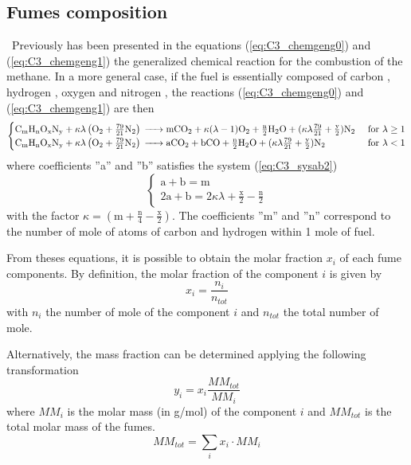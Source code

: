 \subsection{Fumes composition}
\quad\ Previously has been presented in the equations (\ref{eq:C3_chemgeng0}) and (\ref{eq:C3_chemgeng1}) the generalized chemical reaction for the combustion of the methane.
In a more general case, if the fuel is essentially composed of carbon , hydrogen , oxygen  and nitrogen , the reactions (\ref{eq:C3_chemgeng0}) and (\ref{eq:C3_chemgeng1}) are then
\begin{equation}
    \begin{cases}
        \ce{C_{\text{m}}H_{\text{n}}O_{\text{x}}N_{\text{y}} +}\kappa\lambda \left(\ce{O2}+\frac{79}{21}\ce{N2}\right) \ce{-> mCO2 +} \kappa(\lambda-1)\ce{O2 + \frac{n}{2}H2O +} (\kappa\lambda\frac{79}{21} + \frac{\text{y}}{2})\ce{N2} & \text{ for \(\lambda\geq 1\)} \\
        \ce{C_{\text{m}}H_{\text{n}}O_{\text{x}}N_{\text{y}} +}\kappa\lambda \left(\ce{O2}+\frac{79}{21}\ce{N2}\right) \ce{-> aCO2 + bCO + \frac{n}{2}H2O} + (\kappa\lambda\frac{79}{21} + \frac{\text{y}}{2})\ce{N2}                      & \text{ for \(\lambda< 1\)}
    \end{cases}
\end{equation}
where coefficients ''a'' and ''b'' satisfies the system (\ref{eq:C3_sysab2})
\begin{equation}
    \begin{cases}
        \text{a} + \text{b} = \text{m} \\
        2\text{a} + \text{b} = 2\kappa\lambda + \frac{\text{x}}{2} - \frac{\text{n}}{2}
    \end{cases}\label{eq:C3_sysab2}
\end{equation}
with the factor \(\kappa = (\text{m}+\frac{\text{n}}{4}-\frac{\text{x}}{2})\). The coefficients ''m'' and ''n'' correspond to the number of mole of atoms of carbon and hydrogen within 1 mole of fuel.

From theses equations, it is possible to obtain the molar fraction \(x_i\) of each fume components. By definition, the molar fraction of the component \(i\) is given by
\begin{equation}
    x_i = \frac{n_i}{n_{tot}}
\end{equation}
with \(n_i\) the number of mole of the component \(i\) and \(n_{tot}\) the total number of mole.

Alternatively, the mass fraction can be determined applying the following transformation
\begin{equation}
    y_i = x_i\frac{MM_{tot}}{MM_i}
\end{equation}
where \(MM_i\) is the molar mass (in g/mol) of the component \(i\) and \(MM_{tot}\) is the total molar mass of the fumes.
\begin{equation}
    MM_{tot} = \sum_i x_i\cdot MM_i
\end{equation}

